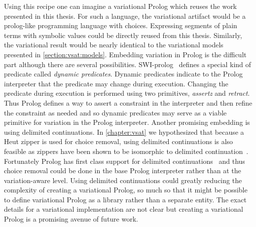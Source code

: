 Using this recipe one can imagine a variational Prolog which reuses the work
presented in this thesis. For such a language, the variational artifact would be
a prolog-like programming language with choices. Expressing segments of plain
terms with symbolic values could be directly reused from this thesis. Similarly,
the variational result would be nearly identical to the variational models
presented in \autoref{section:vsat:models}. Embedding variation in Prolog is the
difficult part although there are several possibilities.
SWI-prolog~\cite{wielemaker:2011:tplp} defines a special kind of predicate
called \emph{dynamic predicates}. Dynamic predicates indicate to the Prolog
interpreter that the predicate may change during execution. Changing the
predicate during execution is performed using two primitives, \emph{assertz} and
\emph{retract}. Thus Prolog defines a way to assert a constraint in the
interpreter and then refine the constraint as needed and so dynamic predicates
may serve as a viable primitive for variation in the Prolog interpreter. Another
promising embedding is using delimited continuations. In \autoref{chapter:vsat}
we hypothesized that because a Heut zipper is used for choice removal, using
delimited continuations is also feasible as zippers have been shown to be
isomorphic to delimited continuation~\cite{olegZippers}. Fortunately Prolog has
first class support for delimited
continuations~\cite{DBLP:journals/tplp/SchrijversDDW13} and thus choice removal
could be done in the base Prolog interpreter rather than at the variation-aware
level. Using delimited continuations could greatly reducing the complexity of
creating a variational Prolog, so much so that it might be possible to define
variational Prolog as a library rather than a separate entity. The exact details
for a variational implementation are not clear but creating a variational Prolog
is a promising avenue of future work.

